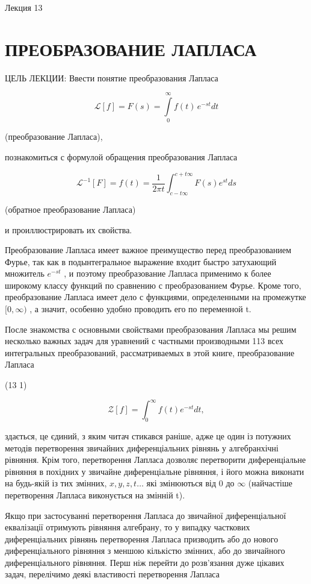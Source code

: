 \documentclass[
  ukrainian,
]{article}
\begin{document}
Лекция 13

\section{ПРЕОБРАЗОВАНИЕ
ЛАПЛАСА}\label{ux43fux440ux435ux43eux431ux440ux430ux437ux43eux432ux430ux43dux438ux435-ux43bux430ux43fux43bux430ux441ux430}

ЦЕЛЬ ЛЕКЦИИ: Ввести понятие преобразования Лапласа

\[
\mathscr{L}[f] = F(s) = \int\limits_0^\infty f(t)\,e^{-st}dt
\]

(преобразование Лапласа),

познакомиться с формулой обращения преобразования Лапласа

\[
\mathscr{L}^{-1}[F] = f(t) = \frac{1}{2\pi t} \int_{c-t\infty}^{c+t\infty} F(s) e^{st} ds
\]

(обратное преобразование Лапласа)

и проиллюстрировать их свойства.

Преобразование Лапласа имеет важное преимущество перед преобразованием
Фурье, так как в подынтегральное выражение входит быстро затухающий
множитель \(e^{-st}\) , и поэтому преобразование Лапласа применимо к
более широкому классу функций по сравнению с преобразованием Фурье.
Кроме того, преобразование Лапласа имеет дело с функциями, определенными
на промежутке \([0, \infty)\) , а значит, особенно удобно проводить его
по переменной t.

После знакомства с основными свойствами преобразования Лапласа мы решим
несколько важных задач для уравнений с частными производными 113 всех
интегральных преобразований, рассматриваемых в этой книге,
преобразование Лапласа

(13 1)

\[
\mathscr{Z}[f] = \int_{0}^{\infty} f(t) e^{-st} dt,
\]

здається, це єдиний, з яким читач стикався раніше, адже це один із
потужних методів перетворення звичайних диференціальних рівнянь у
алгебранхічні рівняння. Крім того, перетворення Лапласа дозволяє
перетворити диференціальне рівняння в похідних у звичайне диференціальне
рівняння, і його можна виконати на будь-якій із тих змінних,
\(x, y, z, t \ldots\) які змінюються від 0 до \(\infty\) (найчастіше
перетворення Лапласа виконується на змінній t).

Якщо при застосуванні перетворення Лапласа до звичайної диференціальної
еквалізації отримують рівняння алгебрану, то у випадку часткових
диференціальних рівнянь перетворення Лапласа призводить або до нового
диференціального рівняння з меншою кількістю змінних, або до звичайного
диференціального рівняння. Перш ніж перейти до розв'язання дуже цікавих
задач, перелічимо деякі властивості перетворення Лапласа
\end{document}
